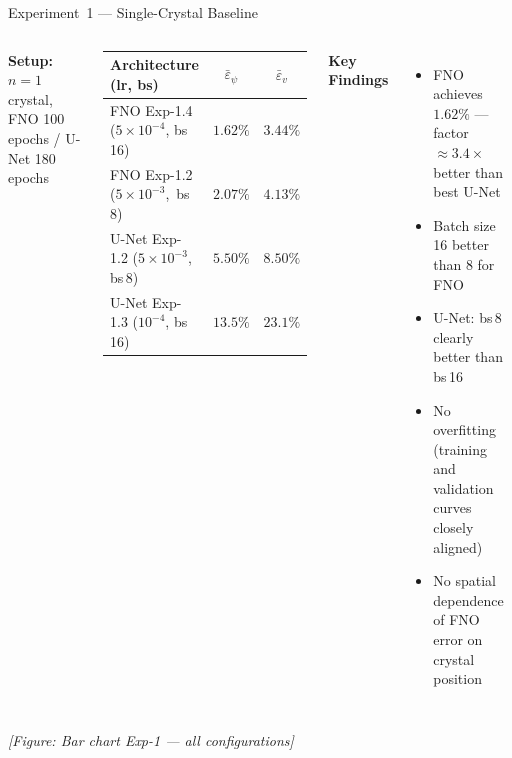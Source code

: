 \documentclass[aspectratio=169, 10pt]{beamer}
\begin{document}
\begin{frame}{Experiment~1 — Single-Crystal Baseline}
  \begin{columns}[T]
      \textbf{Setup:} $n=1$ crystal, FNO 100 epochs / U-Net 180 epochs

      \vspace{0.5em}
      \begin{center}
      \small
      \begin{tabular}{lcc}
        \toprule
        \textbf{Architecture (lr, bs)} & $\bar{\varepsilon}_\psi$ & $\bar{\varepsilon}_v$ \\
        \midrule
        \textcolor{fnocolor}{FNO} Exp-1.4 ($5\!\times\!10^{-4}$, bs\,16) & $\mathbf{1.62\%}$ & $3.44\%$ \\
        \textcolor{fnocolor}{FNO} Exp-1.2 ($5\!\times\!10^{-3}$,\ bs\,8)  & $2.07\%$ & $4.13\%$ \\
        \textcolor{unetcolor}{U-Net} Exp-1.2 ($5\!\times\!10^{-3}$, bs\,8)  & $5.50\%$ & $8.50\%$ \\
        \textcolor{unetcolor}{U-Net} Exp-1.3 ($10^{-4}$, bs\,16)  & $13.5\%$ & $23.1\%$ \\
        \bottomrule
      \end{tabular}
      \end{center}

      \textbf{Key Findings}
      \begin{itemize}
        \item FNO achieves $1.62\%$ — factor ${\approx}3.4\times$ better than best U-Net
        \item Batch size 16 better than 8 for FNO
        \item U-Net: bs\,8 clearly better than bs\,16
        \item No overfitting (training and validation curves closely aligned)
        \item No spatial dependence of FNO error on crystal position
      \end{itemize}
  \end{columns}

  \vspace{0.5em}
  \begin{center}
    \small\textit{[Figure: Bar chart Exp-1 — all configurations]}\\
  \end{center}
\end{frame}
\end{document}
